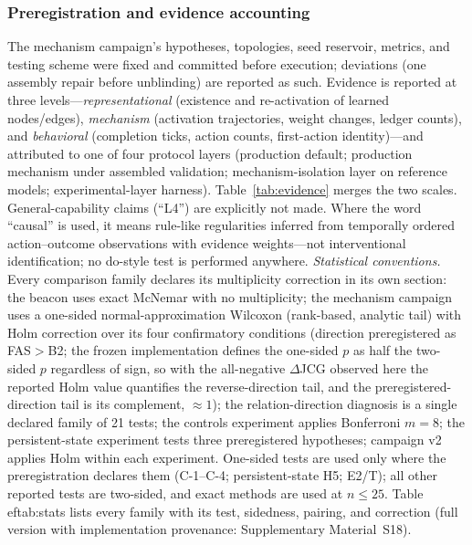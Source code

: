 \documentclass[10pt]{article}
\begin{document}
\subsubsection{Preregistration and evidence accounting}
\label{sec:method-prereg}
The mechanism campaign's hypotheses, topologies, seed reservoir, metrics, and testing scheme were fixed and committed before execution; deviations (one assembly repair before unblinding) are reported as such. Evidence is reported at three levels---\emph{representational} (existence and re-activation of learned nodes/edges), \emph{mechanism} (activation trajectories, weight changes, ledger counts), and \emph{behavioral} (completion ticks, action counts, first-action identity)---and attributed to one of four protocol layers (production default; production mechanism under assembled validation; mechanism-isolation layer on reference models; experimental-layer harness). Table~\ref{tab:evidence} merges the two scales. General-capability claims (``L4'') are explicitly not made. Where the word ``causal'' is used, it means rule-like regularities inferred from temporally ordered action--outcome observations with evidence weights---not interventional identification; no do-style test is performed anywhere. \emph{Statistical conventions.} Every comparison family declares its multiplicity correction in its own section: the beacon uses exact McNemar with no multiplicity; the mechanism campaign uses a one-sided normal-approximation Wilcoxon (rank-based, analytic tail) with Holm correction over its four confirmatory conditions (direction preregistered as FAS${>}$B2; the frozen implementation defines the one-sided $p$ as half the two-sided $p$ regardless of sign, so with the all-negative $\Delta$JCG observed here the reported Holm value quantifies the reverse-direction tail, and the preregistered-direction tail is its complement, ${\approx}1$); the relation-direction diagnosis is a single declared family of 21 tests; the controls experiment applies Bonferroni $m{=}8$; the persistent-state experiment tests three preregistered hypotheses; campaign v2 applies Holm within each experiment. One-sided tests are used only where the preregistration declares them (C-1--C-4; persistent-state H5; E2/T); all other reported tests are two-sided, and exact methods are used at $n{\le}25$. Table~
ef{tab:stats} lists every family with its test, sidedness, pairing, and correction (full version with implementation provenance: Supplementary Material~S18).
\end{document}
